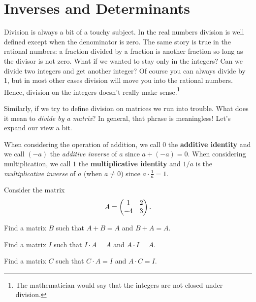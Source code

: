 \section{Inverses and Determinants} \label{S:10.4.InvDet}
Division is always a bit of a touchy subject.  In the real numbers division is well
defined except when the denominator is zero.  The same story is true in the rational
numbers: a fraction divided by a fraction is another fraction so long as the divisor is
not zero.  What if we wanted to stay only in the integers?  Can we divide two integers and
get another integer?  Of course you can always divide by 1, but in most other cases
division will move you into the rational numbers.  Hence, division on the integers doesn't
really make sense.\footnote{The mathematician would say that the integers are not closed
under division.} 

Similarly, if we try to define division on matrices we run into trouble.  What does it
mean to {\it divide by a matrix}?  In general, that phrase is meaningless!  Let's expand
our view a bit.

When considering the operation of addition, we call $0$ the {\bf additive identity} and we
call $(-a)$ the {\it additive inverse} of $a$ since $a + (-a) = 0$.  When considering
multiplication, we call $1$ the {\bf multiplicative identity} and $1/a$ is the {\it
multiplicative inverse} of $a$ (when $a \ne 0$) since $a \cdot \frac{1}{a} = 1$.  



% 
\begin{problem}
    Consider the matrix
    \[ A = \begin{pmatrix} 1 & 2 \\ -4 & 3 \end{pmatrix}. \]
    \ba
        \item Find a matrix $B$ such that $A + B = A$ and $B + A  = A$.
        \item Find a matrix $I$ such that $I \cdot A = A$ and $A \cdot I = A$.
        \item Find a matrix $C$ such that $C \cdot A = I$ and $A \cdot C = I$.
    \ea
\end{problem}

